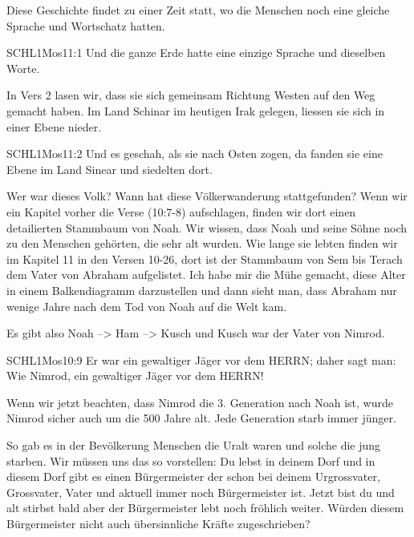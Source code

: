 \documentclass[14pt]{../../inc/mybib}
\newenvironment{block}[1][]{%
  \vspace{1.5em}%
  \noindent\textbf{#1}\par%
  \vspace{0.0em}%
}{%
  \vspace{1em}%
}
\begin{document}
    \vspace{1em}
    \begin{block}
    Diese Geschichte findet zu einer Zeit statt, wo die Menschen noch eine gleiche Sprache und Wortschatz hatten.
    \begin{bibelbox}{SCHL}{1Mos}{11:1}
        Und die ganze Erde hatte eine einzige Sprache und dieselben Worte.
    \end{bibelbox}    
    In Vers 2 lasen wir, dass sie sich gemeinsam Richtung Westen auf den Weg gemacht haben. Im Land Schinar im heutigen Irak gelegen, liessen sie sich in einer Ebene nieder.    
    \begin{bibelbox}{SCHL}{1Mos}{11:2}
        Und es geschah, als sie nach Osten zogen, da fanden sie eine Ebene im Land Sinear und siedelten dort.
    \end{bibelbox}
    Wer war dieses Volk? Wann hat diese Völkerwanderung stattgefunden? Wenn wir ein Kapitel vorher die Verse   (10:7-8) aufschlagen, finden wir dort einen detailierten Stammbaum von Noah. Wir wissen, dass Noah und seine Söhne noch zu den Menschen gehörten, die sehr alt wurden. Wie lange sie lebten finden wir im Kapitel 11 in den Versen 10-26, dort ist der Stammbaum von Sem bis Terach dem Vater von Abraham aufgelistet. Ich habe mir die Mühe gemacht, diese Alter in einem Balkendiagramm darzustellen und dann sieht man, dass Abraham nur wenige Jahre nach dem Tod von Noah auf die Welt kam. 

    
    
    Es gibt also Noah --> Ham --> Kusch und Kusch war der Vater von Nimrod.
    \begin{bibelbox}{SCHL}{1Mos}{10:9}
        Er war ein gewaltiger Jäger vor dem HERRN; daher sagt man: Wie Nimrod, ein gewaltiger Jäger vor dem HERRN!
    \end{bibelbox}
    Wenn wir jetzt beachten, dass Nimrod die 3. Generation nach Noah ist, wurde Nimrod sicher auch um die 500 Jahre alt. Jede Generation starb immer jünger. 
\end{block}
\begin{block}
    So gab es in der Bevölkerung Menschen die Uralt waren und solche die jung starben. Wir müssen uns das so vorstellen:  Du lebst in deinem Dorf und in diesem Dorf gibt es einen Bürgermeister der schon bei deinem Urgrossvater, Grossvater, Vater und aktuell immer noch Bürgermeister ist. Jetzt bist du und alt stirbst bald aber der Bürgermeister lebt noch fröhlich weiter. Würden diesem Bürgermeister nicht auch übersinnliche Kräfte zugeschrieben? 
\end{block}
\end{document}
